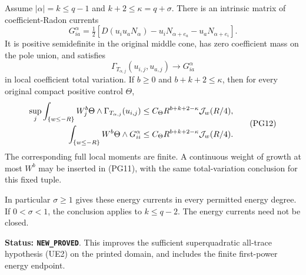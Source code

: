 \begin{theorem}
\label{thm:r11-power-graded-energy}
Assume $|\alpha|=k\leq q-1$ and $k+2\leq\kappa=q+\sigma$.
There is an intrinsic matrix of coefficient-Radon currents
\[
 G^\alpha_{ia}
  =\tfrac12\left[
     D(u_i u_aN_\alpha)-u_iN_{\alpha+e_a}
                           -u_aN_{\alpha+e_i}\right].
 \tag{PG10}
\]
It is positive semidefinite in the original middle cone,
has zero coefficient mass on the pole union, and satisfies
\[
       \Gamma_{T_{\alpha,j}}(u_{i,j},u_{a,j})
                                \longrightarrow G^\alpha_{ia}
 \tag{PG11}
\]
in local coefficient total variation. If $b\geq0$ and
$b+k+2\leq\kappa$, then for every original compact positive
control $\Theta$,
\[
 \begin{split}
 \sup_j\int_{\{w\leq-R\}} W_j^b
           \Theta\wedge\Gamma_{T_{\alpha,j}}(u_{i,j})
   &\leq C_\Theta R^{b+k+2-\kappa}{\cal J}_w(R/4),\\
 \int_{\{w\leq-R\}} W^b\Theta\wedge G^\alpha_{ii}
   &\leq C_\Theta R^{b+k+2-\kappa}{\cal J}_w(R/4).
 \end{split}
 \tag{PG12}
\]
The corresponding full local moments are finite. A continuous
weight of growth at most $W^b$ may be inserted in (PG11),
with the same total-variation conclusion for this fixed tuple.

In particular $\sigma\geq1$ gives these energy currents in
every permitted energy degree. If $0<\sigma<1$, the conclusion
applies to $k\leq q-2$. The energy currents need not be closed.
\end{theorem}

\noindent\textbf{Status: \texttt{NEW\_PROVED}}. This improves
the sufficient superquadratic all-trace hypothesis (UE2) on the
printed domain, and includes the finite first-power energy endpoint.

